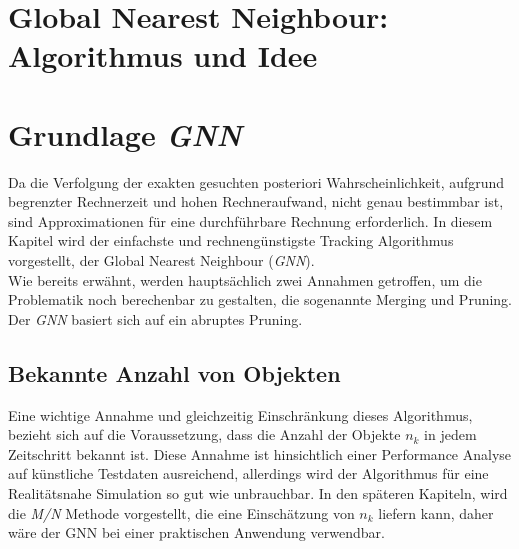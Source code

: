 \documentclass[10pt,a4paper]{article}
\begin{document}
\section{Global Nearest Neighbour: Algorithmus und Idee}
\section{Grundlage \textit{GNN}}
Da die Verfolgung der exakten gesuchten posteriori Wahrscheinlichkeit, aufgrund begrenzter Rechnerzeit und hohen Rechneraufwand, nicht genau bestimmbar ist, sind Approximationen für eine durchführbare Rechnung erforderlich. In diesem Kapitel wird der einfachste und rechnengünstigste Tracking Algorithmus vorgestellt, der Global Nearest Neighbour (\textit{GNN}).\\
Wie bereits erwähnt, werden hauptsächlich zwei Annahmen getroffen, um die Problematik noch berechenbar zu gestalten, die sogenannte Merging und Pruning. Der \textit{GNN} basiert sich auf ein abruptes Pruning.
\subsection{Bekannte Anzahl von Objekten}
Eine wichtige Annahme und gleichzeitig Einschränkung dieses Algorithmus, bezieht sich auf die Voraussetzung, dass die Anzahl der Objekte $n_k$ in jedem Zeitschritt bekannt ist. Diese Annahme ist hinsichtlich einer Performance Analyse auf künstliche Testdaten ausreichend, allerdings wird der Algorithmus für eine Realitätsnahe Simulation so gut wie unbrauchbar. In den späteren Kapiteln, wird die \textit{M/N} Methode vorgestellt, die eine Einschätzung von $n_k$ liefern kann, daher wäre der GNN bei einer praktischen Anwendung verwendbar.
\end{document}
